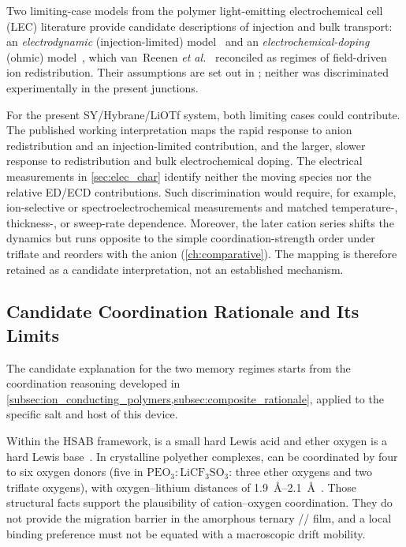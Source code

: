 \documentclass[12pt, twoside]{report}
\begin{document}
Two limiting-case models from the polymer light-emitting electrochemical cell (LEC) literature provide candidate descriptions of injection and bulk transport: an \emph{electrodynamic} (injection-limited) model~\cite{deMello1998,deMello2002} and an \emph{electrochemical-doping} (ohmic) model~\cite{Pei1995,Smith1997,Matyba2009}, which van~Reenen \textit{et al.}~\cite{vanReenen2010} reconciled as regimes of field-driven ion redistribution. Their assumptions are set out in ; neither was discriminated experimentally in the present junctions.

For the present SY/Hybrane/LiOTf system, both limiting cases could contribute. The published working interpretation maps the rapid response to anion redistribution and an injection-limited contribution, and the larger, slower response to  redistribution and bulk electrochemical doping. The electrical measurements in \cref{sec:elec_char} identify neither the moving species nor the relative ED/ECD contributions. Such discrimination would require, for example, ion-selective or spectroelectrochemical measurements and matched temperature-, thickness-, or sweep-rate dependence. Moreover, the later cation series shifts the dynamics but runs opposite to the simple coordination-strength order under triflate and reorders with the anion (\cref{ch:comparative}). The mapping is therefore retained as a candidate interpretation, not an established mechanism.

\subsection{Candidate Coordination Rationale and Its Limits}\label{subsec:lewis}

The candidate explanation for the two memory regimes starts from the coordination reasoning developed in \cref{subsec:ion_conducting_polymers,subsec:composite_rationale}, applied to the specific salt and host of this device.

Within the HSAB framework,  is a small hard Lewis acid and ether oxygen is a hard Lewis base~\cite{Pearson1963}. In crystalline polyether complexes,  can be coordinated by four to six oxygen donors (five in \(\mathrm{PEO_3{:}LiCF_3SO_3}\): three ether oxygens and two triflate oxygens), with oxygen--lithium distances of \SIrange{1.9}{2.1}{\angstrom}~\cite{Lightfoot1993}. Those structural facts support the plausibility of cation--oxygen coordination. They do not provide the migration barrier in the amorphous ternary \SY{}/\Hybrane{}/\LiTf{} film, and a local binding preference must not be equated with a macroscopic drift mobility.
\end{document}
